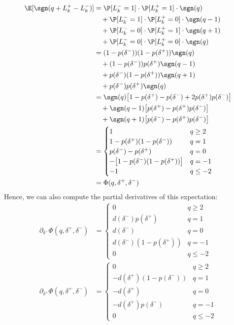 \documentclass[12pt]{article}
\begin{document}
\begin{align}
\E [\sgn(q + L_k^+ - L_k^-)] & = \P[L_k^- = 1] \cdot \P[L_k^+ = 1] \cdot \sgn(q) \nonumber \\
& \quad + \P[L_k^- = 1] \cdot \P[L_k^+ = 0] \cdot \sgn(q - 1) \nonumber \\
& \quad +  \P[L_k^- = 0] \cdot \P[L_k^+ = 1] \cdot \sgn(q+1) \nonumber \\
& \quad + \P[L_k^- = 0] \cdot \P[L_k^+ = 0] \cdot \sgn(q) \nonumber \\
& = (1 - p(\delta^-))(1-p(\delta^+)) \sgn(q) \nonumber \\
& \quad + (1 - p(\delta^-)) p(\delta^+) \sgn(q - 1) \nonumber \\
& \quad + p(\delta^-) (1-p(\delta^+))  \sgn(q+1) \nonumber \\
& \quad + p(\delta^-) p(\delta^+)  \sgn(q) \nonumber \\
& = \sgn(q) \bigl[ 1 - p(\delta^+) - p(\delta^-) + 2 p(\delta^+) p(\delta^-) \bigr] \nonumber \\
& \quad + \sgn(q-1) \bigl[ p(\delta^+)  - p(\delta^+) p(\delta^-) \bigr]  \nonumber \\
& \quad + \sgn(q+1) \bigl[ p(\delta^-)  - p(\delta^+) p(\delta^-) \bigr]  \nonumber \\
& = \begin{cases} 
1 & q \geq 2 \\
1 - p(\delta^+)(1 - p(\delta^-)) & q = 1 \\
p(\delta^-) - p(\delta^+) & q = 0 \\
-\bigl[ 1 - p(\delta^-)(1 - p(\delta^+)) \bigr] & q = -1 \\
-1 & q \leq -2
\end{cases} \\
& = \Phi(q, \delta^+, \delta^-)
\end{align}
Hence, we can also compute the partial derivatives of this expectation:
\begin{align}
\partial_{\delta^-} \Phi(q, \delta^+, \delta^-) & =  \begin{cases} 
0 & q \geq 2 \\
d(\delta^-)p(\delta^+) & q = 1 \\
d(\delta^-) & q = 0 \\
d(\delta^-)(1 - p(\delta^+))  & q = -1 \\
0 & q \leq -2
\end{cases} \\
\partial_{\delta^+} \Phi(q, \delta^+, \delta^-) & =  \begin{cases} 
0 & q \geq 2 \\
- d(\delta^+)(1 - p(\delta^-)) & q = 1 \\
- d(\delta^+) & q = 0 \\
- d(\delta^+) p(\delta^-) & q = -1 \\
0 & q \leq -2
\end{cases}
\end{align}
\end{document}

